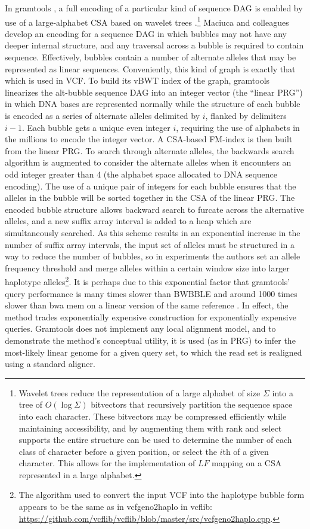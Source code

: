 In gramtools \cite{maciuca2016natural}, a full encoding of a particular kind of sequence DAG is enabled by use of a large-alphabet CSA based on wavelet trees \cite{grossi2003high}.\footnote{Wavelet trees reduce the representation of a large alphabet of size $\Sigma$ into a tree of $O(\log{\Sigma})$ bitvectors that recursively partition the sequence space into each character.
These bitvectors may be compressed efficiently while maintaining accessibility, and by augmenting them with rank and select supports the entire structure can be used to determine the number of each class of character before a given position, or select the $i$th of a given character.
This allows for the implementation of $LF$ mapping on a CSA represented in a large alphabet.}
Maciuca and colleagues develop an encoding for a sequence DAG in which bubbles may not have any deeper internal structure, and any traversal across a bubble is required to contain sequence.
Effectively, bubbles contain a number of alternate alleles that may be represented as linear sequences.
Conveniently, this kind of graph is exactly that which is used in VCF.
To build its vBWT index of the graph, gramtools linearizes the alt-bubble sequence DAG into an integer vector (the ``linear PRG'') in which DNA bases are represented normally while the structure of each bubble is encoded as a series of alternate alleles delimited by $i$, flanked by delimiters $i-1$.
Each bubble gets a unique even integer $i$, requiring the use of alphabets in the millions to encode the integer vector.
A CSA-based FM-index is then built from the linear PRG.
To search through alternate alleles, the backwards search algorithm is augmented to consider the alternate alleles when it encounters an odd integer greater than 4 (the alphabet space allocated to DNA sequence encoding).
The use of a unique pair of integers for each bubble ensures that the alleles in the bubble will be sorted together in the CSA of the linear PRG.
The encoded bubble structure allows backward search to furcate across the alternative alleles, and a new suffix array interval is added to a heap which are simultaneously searched.
As this scheme results in an exponential increase in the number of suffix array intervals, the input set of alleles must be structured in a way to reduce the number of bubbles, so in experiments the authors set an allele frequency threshold and merge alleles within a certain window size into larger haplotype alleles\footnote{The algorithm used to convert the input VCF into the haplotype bubble form appears to be the same as in vcfgeno2haplo in vcflib: \url{https://github.com/vcflib/vcflib/blob/master/src/vcfgeno2haplo.cpp}.}.
It is perhaps due to this exponential factor that gramtools' query performance is many times slower than BWBBLE and around 1000 times slower than bwa mem on a linear version of the same reference \cite{maciuca2016natural}.
In effect, the method trades exponentially expensive construction for exponentially expensive queries.
Gramtools does not implement any local alignment model, and to demonstrate the method's conceptual utility, it is used (as in PRG) to infer the most-likely linear genome for a given query set, to which the read set is realigned using a standard aligner.

